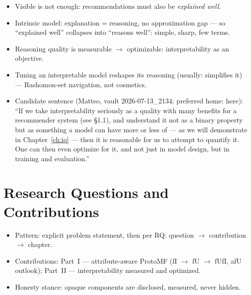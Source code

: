 \begin{itemize}
    \item Visible is not enough: recommendations must also be \emph{explained well}.
    \item Intrinsic model: explanation = reasoning, no approximation gap — so ``explained well'' collapses into ``reasons well'': simple, sharp, few terms.
    \item Reasoning quality is measurable $\to$ optimizable: interpretability as an objective.
    \item Tuning an interpretable model reshapes its reasoning (usually: simplifies it) — Rashomon-set navigation, not cosmetics.
    \item Candidate sentence (Matteo, vault 2026-07-13\_2134; preferred home: here): ``If we take interpretability seriously as a quality with many benefits for a recommender system (see §1.1), and understand it not as a binary property but as something a model can have more or less of — as we will demonstrate in Chapter~\ref{ch:iq} — then it is reasonable for us to attempt to quantify it. One can then even optimize for it, and not just in model design, but in training and evaluation.''
\end{itemize}

\section{Research Questions and Contributions}
\label{sec:intro-rq-contributions}
%
\begin{itemize}
    \item Pattern: explicit problem statement, then per RQ: question $\to$ contribution $\to$ chapter.
    \item Contributions: Part~I — attribute-aware ProtoMF (fI $\to$ fU $\to$ fUfI, afU outlook); Part~II — interpretability measured and optimized.
    \item Honesty stance: opaque components are disclosed, measured, never hidden.
\end{itemize}


